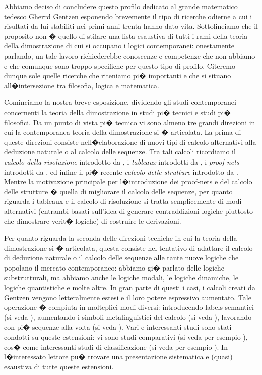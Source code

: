 \documentclass[a4paper,12pt]{aphex}
\begin{document}
Abbiamo deciso di concludere questo profilo dedicato al grande matematico tedesco Gherrd Gentzen esponendo brevemente il tipo di ricerche odierne a cui i risultati da lui stabiliti nei primi anni trenta hanno dato vita. Sottolineiamo che il proposito non � quello di stilare una lista esaustiva di tutti i rami della teoria della dimostrazione di cui si occupano i logici contemporanei: onestamente parlando, un tale lavoro richiederebbe conoscenze e competenze che non abbiamo e che comunque sono troppo specifiche per questo tipo di profilo. Citeremo dunque sole quelle ricerche che riteniamo pi� importanti e che si situano all�intersezione tra filosofia, logica e matematica. 

Cominciamo la nostra breve esposizione, dividendo gli studi contemporanei concernenti la teoria della dimostrazione in studi pi� tecnici e studi pi� filosofici. Da un punto di vista pi� tecnico vi sono almeno tre grandi direzioni in cui la contemporanea teoria della dimostrazione si � articolata. La prima di queste direzioni consiste nell�elaborazione di nuovi tipi di calcolo alternativi alla deduzione naturale o al calcolo delle sequenze.  Tra tali calcoli ricordiamo il \emph{calcolo della risoluzione} introdotto da \cite{robinson}, i \emph{tableaux} introdotti da \cite{tableaux},  i \emph{proof-nets} introdotti da \cite{girard}, ed infine il pi� recente \emph{calcolo delle strutture} introdotto da \cite{guglielmi}. Mentre la motivazione principale per l�introduzione dei proof-nets e del calcolo delle strutture � quella di migliorare il calcolo delle sequenze, per quanto riguarda i tableaux e il calcolo di risoluzione si tratta semplicemente di modi alternativi (entrambi basati sull'idea di generare contraddizioni logiche piuttosto che dimostrare verit� logiche) di costruire le derivazioni. 

Per quanto riguarda la seconda delle direzioni tecniche in cui la teoria della dimostrazione si � articolata, questa consiste nel tentativo di adattare il calcolo di deduzione naturale o il calcolo delle sequenze alle tante nuove logiche che popolano il mercato contemporaneo: abbiamo gi� parlato delle logiche substrutturali, ma abbiamo anche le logiche modali, le logiche dinamiche, le logiche quantistiche e molte altre. In gran parte di questi i casi, i calcoli creati da Gentzen vengono letteralmente estesi e il loro potere espressivo aumentato. Tale operazione � compiuta in molteplici modi diversi: introducendo labels semantici (si veda \cite{gabbay}), aumentando i simboli metalinguistici del calcolo (si veda \cite{belnap2}), lavorando con pi� sequenze alla volta (si veda \cite{avron}).   Vari e interessanti studi sono stati condotti su queste estensioni: vi sono studi comparativi (si veda per esempio \cite{io6, Ramanayake}), cos� come interessanti studi di classificazione (si veda per esempio \cite{ciabattoni, ciabattoni2}). In \cite{poggiolesi} l�interessato lettore pu� trovare una presentazione sistematica e (quasi) esaustiva di tutte queste estensioni.
\end{document}
